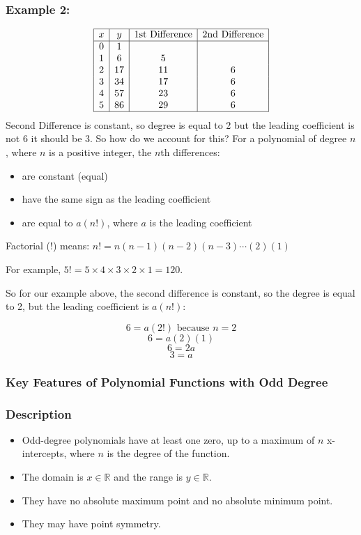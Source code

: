 \documentclass{article}
\begin{document}
\subsubsection*{Example 2:}

\[
\begin{array}{|c|c|c|c|}
\hline
x & y & \text{1st Difference} & \text{2nd Difference} \\
\hline
0 & 1 & & \\
1 & 6 & 5 & \\
2 & 17 & 11 & 6 \\
3 & 34 & 17 & 6 \\
4 & 57 & 23 & 6 \\
5 & 86 & 29 & 6 \\
\hline
\end{array}
\]
Second Difference is constant, so degree is equal to 2 but the leading coefficient is not 6 it should be 3. So how do we account for this?
For a polynomial of degree \( n \), where \( n \) is a positive integer, the \( n \)th differences:
\begin{itemize}
    \item are constant (equal)
    \item have the same sign as the leading coefficient
    \item are equal to \( a(n!) \), where \( a \) is the leading coefficient
\end{itemize}

Factorial (!) means: \( n! = n(n - 1)(n - 2)(n - 3) \dotsm (2)(1) \)

For example, \( 5! = 5 \times 4 \times 3 \times 2 \times 1 = 120 \).

So for our example above, the second difference is constant, so the degree is equal to 2, but the leading coefficient is \( a(n!) \):

\[ 6 = a(2!) \text{ because } n = 2 \]
\[ 6 = a(2)(1) \]
\[ 6 = 2a \]
\[ 3 = a \]

\subsubsection{Key Features of Polynomial Functions with Odd Degree}

\subsubsection*{Description}

\begin{itemize}
    \item Odd-degree polynomials have at least one zero, up to a maximum of \( n \) x-intercepts, where \( n \) is the degree of the function.
    \item The domain is \( x \in \mathbb{R} \) and the range is \( y \in \mathbb{R} \).
    \item They have no absolute maximum point and no absolute minimum point.
    \item They may have point symmetry.
\end{itemize}
\end{document}
